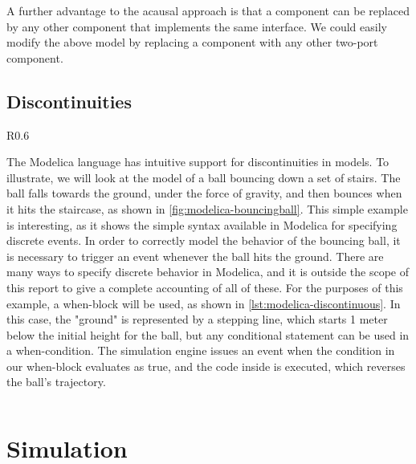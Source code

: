 \documentclass[\rootfolder/main.tex]{subfiles}
\begin{document}
A further advantage to the acausal approach is that a component can be replaced by any other component that implements the same interface.
We could easily modify the above model by replacing a component with any other two-port component.

\subsection{Discontinuities}

\begin{wrapfigure}{R}{0.6\columnwidth}
    \caption{Ball bouncing down stairs.\label{fig:modelica-bouncingball}}
\end{wrapfigure}

The Modelica language has intuitive support for discontinuities in models.
To illustrate, we will look at the model of a ball bouncing down a set of stairs.
The ball falls towards the ground, under the force of gravity, and then bounces when it hits the staircase, as shown in \cref{fig:modelica-bouncingball}.
This simple example is interesting, as it shows the simple syntax available in Modelica for specifying discrete events.
In order to correctly model the behavior of the bouncing ball, it is necessary to trigger an event whenever the ball hits the ground.
There are many ways to specify discrete behavior in Modelica, and it is outside the scope of this report to give a complete accounting of all of these.
For the purposes of this example, a when-block will be used, as shown in \cref{lst:modelica-discontinuous}.
In this case, the "ground" is represented by a stepping line, which starts 1 meter below the initial height for the ball, but any conditional statement can be used in a when-condition.
The simulation engine issues an event when the condition in our when-block evaluates as true, and the code inside is executed, which reverses the ball's trajectory.

\begin{listing}[ht]
    \inputminted[fontsize=\footnotesize]{Modelica}{\rootfolder/Models/MasterProject/Models/BouncingBall.mo}
    \caption{Bouncing ball model showing discontinuous equation\label{lst:modelica-discontinuous}}
\end{listing}

\section{Simulation}
\end{document}
